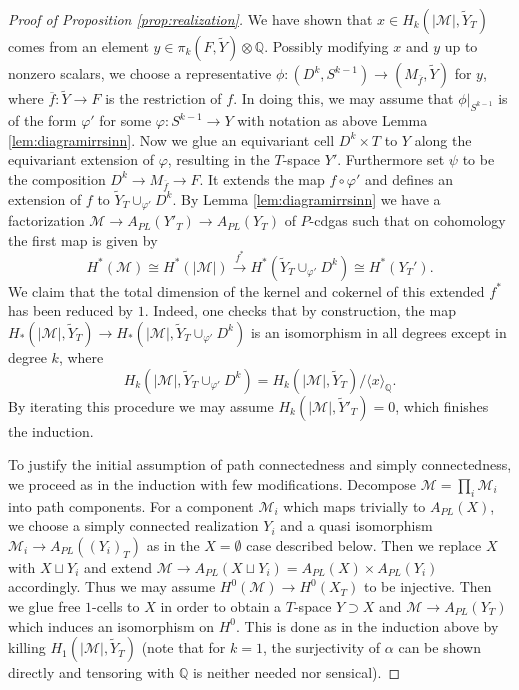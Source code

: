 \documentclass[12pt,a4paper]{article}
\theoremstyle{definition}
\begin{document}
\begin{proof}[Proof of Proposition \ref{prop:realization}]
We have shown that $x\in H_k(\vert \mathcal{M}\vert,\tilde{Y}_T)$ comes from an element $y\in \pi_k(F,\tilde{Y})\otimes \mathbb{Q}$. Possibly modifying $x$ and $y$ up to nonzero scalars, we choose a representative $\phi\colon (D^k,S^{k-1})\rightarrow (M_{\overline{f}}, \tilde{Y})$ for $y$, where $\overline{f}\colon \tilde{Y}\rightarrow F$ is the restriction of $f$. In doing this, we may assume that $\phi|_{S^{k-1}}$ is of the form $\varphi'$ for some $\varphi\colon S^{k-1}\rightarrow Y$ with notation as above Lemma \ref{lem:diagramirrsinn}. Now we glue an equivariant cell $D^k\times T$ to $Y$ along the equivariant extension of $\varphi$, resulting in the $T$-space $Y'$. Furthermore set $\psi$ to be the composition $D^k\rightarrow M_{\overline{f}}\rightarrow F$. It extends the map $f\circ\varphi'$ and defines an extension of $f$ to $\tilde{Y}_T\cup_{\varphi'} D^k$.
By Lemma \ref{lem:diagramirrsinn} we have a factorization $\mathcal{M}\rightarrow A_{PL}(Y'_T)\rightarrow A_{PL}(Y_T)$ of $P$-cdgas such that on cohomology the first map is given by
\[H^*(\mathcal{M})\cong H^*(\vert \mathcal{M}\vert)\xrightarrow{f^*} H^*(\tilde{Y}_T\cup_{\varphi'} D^k)\cong H^*(Y_T').\]
We claim that the total dimension of the kernel and cokernel of this extended $f^*$ has been reduced by $1$. Indeed, one checks that by construction, the map $H_*(\vert\mathcal{M}\vert, \tilde{Y}_T)\rightarrow H_*(\vert \mathcal{M}\vert, \tilde{Y}_T\cup_{\varphi'} D^k)$ is an isomorphism in all degrees except in degree $k$, where \[H_k(\vert \mathcal{M}\vert, \tilde{Y}_T\cup_{\varphi'} D^k)= H_k(\vert \mathcal{M}\vert, \tilde{Y}_T)/\langle x\rangle_\mathbb{Q}.\] By iterating this procedure we may assume $H_k(\vert \mathcal{M}\vert, \tilde{Y}'_T)=0$, which finishes the induction.


To justify the initial assumption of path connectedness and simply connectedness, we proceed as in the induction with few modifications. Decompose $\mathcal{M}=\prod_i \mathcal{M}_i$ into path components. For a component $\mathcal{M}_i$ which maps trivially to $A_{PL}(X)$, we choose a simply connected realization $Y_i$ and a quasi isomorphism $\mathcal{M}_i\rightarrow A_{PL}((Y_i)_T)$ as in the $X=\emptyset$ case described below. Then we replace $X$ with $X\sqcup Y_i$ and extend $\mathcal{M}\rightarrow A_{PL}(X\sqcup Y_i)=A_{PL}(X)\times A_{PL}(Y_i)$ accordingly. Thus we may assume $H^0(\mathcal{M})\rightarrow H^0(X_T)$ to be injective.
Then we glue free $1$-cells to $X$ in order to obtain a $T$-space $Y\supset X$ and $\mathcal{M}\rightarrow A_{PL}(Y_T)$ which induces an isomorphism on $H^0$. This is done as in the induction above by killing $H_1(\vert \mathcal{M}\vert, \tilde{Y}_T)$ (note that for $k=1$, the surjectivity of $\alpha$ can be shown directly and tensoring with $\mathbb{Q}$ is neither needed nor sensical).


\end{proof}
\end{document}
